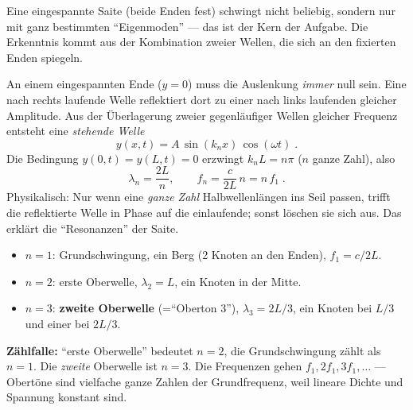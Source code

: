 

Eine eingespannte Saite (beide Enden fest) schwingt nicht beliebig, sondern
nur mit ganz bestimmten ``Eigenmoden'' --- das ist der Kern der Aufgabe.
Die Erkenntnis kommt aus der Kombination zweier Wellen, die sich an den
fixierten Enden spiegeln.

\begin{werkzeugkasten}
An einem eingespannten Ende ($y=0$) muss die Auslenkung \emph{immer} null sein.
Eine nach rechts laufende Welle reflektiert dort zu einer nach links
laufenden gleicher Amplitude. Aus der Überlagerung zweier gegenläufiger
Wellen gleicher Frequenz entsteht eine \emph{stehende Welle}
\begin{equation}
  y(x,t)=A\,\sin(k_n x)\,\cos(\omega t)\;.
\end{equation}
Die Bedingung $y(0,t)=y(L,t)=0$ erzwingt $k_n L=n\pi$ ($n$ ganze Zahl), also
\begin{equation}
  \lambda_n=\frac{2L}{n},\qquad
  f_n=\frac{c}{2L}\,n=n\,f_1\;.
\end{equation}
Physikalisch: Nur wenn eine \emph{ganze Zahl} Halbwellenlängen ins Seil
passen, trifft die reflektierte Welle in Phase auf die einlaufende; sonst
löschen sie sich aus. Das erklärt die ``Resonanzen'' der Saite.
\end{werkzeugkasten}

\begin{werkzeugkasten}
\begin{itemize}
  \item $n=1$: Grundschwingung, ein Berg (2 Knoten an den Enden), $f_1=c/2L$.
  \item $n=2$: erste Oberwelle, $\lambda_2=L$, ein Knoten in der Mitte.
  \item $n=3$: \textbf{zweite Oberwelle} (=``Oberton 3''), $\lambda_3=2L/3$,
        ein Knoten bei $L/3$ und einer bei $2L/3$.
\end{itemize}
\textbf{Zählfalle:} ``erste Oberwelle'' bedeutet $n=2$, die Grundschwingung
zählt als $n=1$. Die \emph{zweite} Oberwelle ist $n=3$. Die Frequenzen gehen
$f_1,2f_1,3f_1,\dots$ --- Obertöne sind vielfache ganze Zahlen der
Grundfrequenz, weil lineare Dichte und Spannung konstant sind.
\end{werkzeugkasten}

